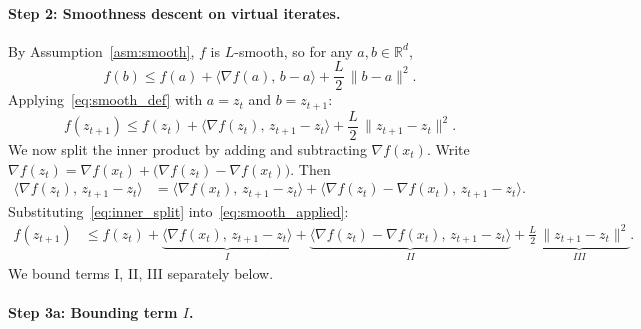 \documentclass{article}
\begin{document}
\paragraph{Step 2: Smoothness descent on virtual iterates.}

By Assumption~\ref{asm:smooth}, $f$ is $L$-smooth, so for any
$a, b \in \mathbb{R}^d$,
\begin{equation}
f(b) \leq f(a) + \langle \nabla f(a),\, b - a \rangle
       + \frac{L}{2}\,\|b - a\|^2.
\label{eq:smooth_def}
\end{equation}
Applying~\eqref{eq:smooth_def} with $a = z_t$ and $b = z_{t+1}$:
\begin{equation}
f(z_{t+1}) \leq f(z_t) + \langle \nabla f(z_t),\, z_{t+1} - z_t \rangle
             + \frac{L}{2}\,\|z_{t+1} - z_t\|^2.
\label{eq:smooth_applied}
\end{equation}
We now split the inner product by adding and subtracting $\nabla f(x_t)$.
Write $\nabla f(z_t) = \nabla f(x_t) + \bigl(\nabla f(z_t) - \nabla f(x_t)\bigr)$.
Then
\begin{align}
\langle \nabla f(z_t),\, z_{t+1} - z_t \rangle
&= \langle \nabla f(x_t),\, z_{t+1} - z_t \rangle
   + \langle \nabla f(z_t) - \nabla f(x_t),\, z_{t+1} - z_t \rangle.
\label{eq:inner_split}
\end{align}
Substituting~\eqref{eq:inner_split} into~\eqref{eq:smooth_applied}:
\begin{align}
f(z_{t+1})
&\leq f(z_t)
  + \underbrace{\langle \nabla f(x_t),\, z_{t+1} - z_t \rangle}_{I}
  + \underbrace{\langle \nabla f(z_t) - \nabla f(x_t),\,
    z_{t+1} - z_t \rangle}_{II}
  + \underbrace{\frac{L}{2}\,\|z_{t+1} - z_t\|^2}_{III}.
\label{eq:three_terms}
\end{align}
We bound terms I, II, III separately below.

\paragraph{Step 3a: Bounding term $I$.}
\end{document}
